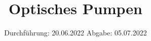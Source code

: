 

\subject{V21}
\title{Optisches Pumpen}
\date{%
  Durchführung: 20.06.2022
  \hspace{3em}
  Abgabe: 05.07.2022
}



\maketitle
\thispagestyle{empty}
\tableofcontents
\newpage






\printbibliography{}


